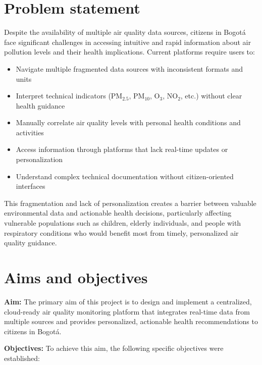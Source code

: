 \section{Problem statement}
\label{sec:intro_prob_art}

Despite the availability of multiple air quality data sources, citizens in Bogotá face significant challenges in accessing intuitive and rapid information about air pollution levels and their health implications. Current platforms require users to:

\begin{itemize}
    \item Navigate multiple fragmented data sources with inconsistent formats and units
    \item Interpret technical indicators (PM$_{2.5}$, PM$_{10}$, O$_3$, NO$_2$, etc.) without clear health guidance
    \item Manually correlate air quality levels with personal health conditions and activities
    \item Access information through platforms that lack real-time updates or personalization
    \item Understand complex technical documentation without citizen-oriented interfaces
\end{itemize}

This fragmentation and lack of personalization creates a barrier between valuable environmental data and actionable health decisions, particularly affecting vulnerable populations such as children, elderly individuals, and people with respiratory conditions who would benefit most from timely, personalized air quality guidance.

\section{Aims and objectives}
\label{sec:intro_aims_obj}

\textbf{Aim:} The primary aim of this project is to design and implement a centralized, cloud-ready air quality monitoring platform that integrates real-time data from multiple sources and provides personalized, actionable health recommendations to citizens in Bogotá.

\textbf{Objectives:} To achieve this aim, the following specific objectives were established:


